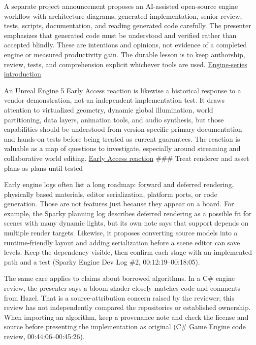 A separate project announcement proposes an AI-assisted open-source engine workflow with architecture diagrams, generated implementation, senior review, tests, scripts, documentation, and reading generated code carefully. The presenter emphasizes that generated code must be understood and verified rather than accepted blindly. These are intentions and opinions, not evidence of a completed engine or measured productivity gain. The durable lesson is to keep authorship, review, tests, and comprehension explicit whichever tools are used. \href{https://www.youtube.com/watch?v=-paLdjChPxo&t=8m32s}{Engine-series introduction}

An Unreal Engine 5 Early Access reaction is likewise a historical response to a vendor demonstration, not an independent implementation test. It draws attention to virtualized geometry, dynamic global illumination, world partitioning, data layers, animation tools, and audio synthesis, but those capabilities should be understood from version-specific primary documentation and hands-on tests before being treated as current guarantees. The reaction is valuable as a map of questions to investigate, especially around streaming and collaborative world editing. \href{https://www.youtube.com/watch?v=nyZnRxvSJrY&t=4m40s}{Early Access reaction} \#\#\# Treat renderer and asset plans as plans until tested

Early engine logs often list a long roadmap: forward and deferred rendering, physically based materials, editor serialization, platform ports, or code generation. Those are not features just because they appear on a board. For example, the Sparky planning log describes deferred rendering as a possible fit for scenes with many dynamic lights, but its own note says that support depends on multiple render targets. Likewise, it proposes converting source models into a runtime-friendly layout and adding serialization before a scene editor can save levels. Keep the dependency visible, then confirm each stage with an implemented path and a test (Sparky Engine Dev Log \#2, 00:12:19--00:18:05).

The same care applies to claims about borrowed algorithms. In a C\# engine review, the presenter says a bloom shader closely matches code and comments from Hazel. That is a source-attribution concern raised by the reviewer; this review has not independently compared the repositories or established ownership. When importing an algorithm, keep a provenance note and check the license and source before presenting the implementation as original (C\# Game Engine code review, 00:44:06--00:45:26).

